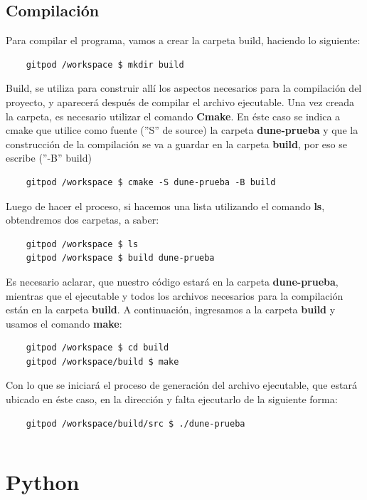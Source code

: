 \documentclass{scrarticle}
\begin{document}
\subsection{Compilación}
Para compilar el programa, vamos a crear la  carpeta build, haciendo lo siguiente: 
\begin{verbatim}
	gitpod /workspace $ mkdir build
\end{verbatim}
Build, se utiliza para construir allí los aspectos necesarios para la compilación del proyecto, y aparecerá después 
de compilar el archivo ejecutable.  Una vez creada la carpeta, es necesario utilizar el comando \textbf{Cmake}.  En éste caso se 
indica a cmake que utilice como fuente (''S'' de source) la carpeta \textbf{dune-prueba} y que la construcción de la 
compilación se va a guardar en la carpeta \textbf{build}, por eso se escribe (''-B'' build) 
\begin{verbatim}
	gitpod /workspace $ cmake -S dune-prueba -B build
\end{verbatim}
Luego de hacer el proceso, si hacemos una lista utilizando el comando \textbf{ls}, obtendremos dos carpetas, a saber:
\begin{verbatim}
	gitpod /workspace $ ls
	gitpod /workspace $ build dune-prueba
\end{verbatim}
Es necesario aclarar, que nuestro código estará en la carpeta \textbf{dune-prueba}, mientras que el ejecutable y 
todos los archivos necesarios para la compilación están en la carpeta \textbf{build}.  A continuación, ingresamos 
a la carpeta \textbf{build} y usamos el comando \textbf{make}:
\begin{verbatim}
	gitpod /workspace $ cd build
	gitpod /workspace/build $ make
\end{verbatim}
Con lo que se iniciará el proceso de generación del archivo ejecutable, que estará ubicado en éste caso, en 
la dirección y falta ejecutarlo de la siguiente forma:
\begin{verbatim}
	gitpod /workspace/build/src $ ./dune-prueba
\end{verbatim}
\begin{listing}[ht!]
	\inputminted{bash}{dune-learn-1.txt}
\end{listing}
\newpage
\section{Python}
\end{document}
